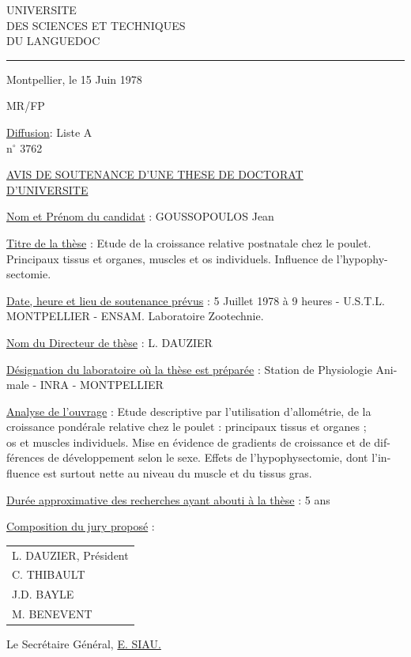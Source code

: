 UNIVERSITE\\
DES SCIENCES ET TECHNIQUES\\
DU LANGUEDOC\\
\rule{2cm}{0.4pt}

Montpellier, le 15 Juin 1978

MR/FP

\uline{Diffusion}: Liste A\\
n$^{\circ}$ 3762

\uline{AVIS DE SOUTENANCE D'UNE THESE DE DOCTORAT}\\
\uline{D'UNIVERSITE}

\uline{Nom et Prénom du candidat} : GOUSSOPOULOS Jean

\uline{Titre de la thèse} : Etude de la croissance relative postnatale chez le poulet.\\
Principaux tissus et organes, muscles et os individuels. Influence de l'hypophy-\\
sectomie.

\uline{Date, heure et lieu de soutenance prévus} : 5 Juillet 1978 à 9 heures - U.S.T.L.\\
MONTPELLIER - ENSAM. Laboratoire Zootechnie.

\uline{Nom du Directeur de thèse} : L. DAUZIER

\uline{Désignation du laboratoire où la thèse est préparée} : Station de Physiologie Ani-\\
male - INRA - MONTPELLIER

\uline{Analyse de l'ouvrage} : Etude descriptive par l'utilisation d'allométrie, de la\\
croissance pondérale relative chez le poulet : principaux tissus et organes ;\\
os et muscles individuels. Mise en évidence de gradients de croissance et de dif-\\
férences de développement selon le sexe. Effets de l'hypophysectomie, dont l'in-\\
fluence est surtout nette au niveau du muscle et du tissus gras.

\uline{Durée approximative des recherches ayant abouti à la thèse} : 5 ans

\uline{Composition du jury proposé} :
\begin{tabular}[t]{l}
L. DAUZIER, Président\\
C. THIBAULT\\
J.D. BAYLE\\
M. BENEVENT
\end{tabular}

Le Secrétaire Général,
\uline{E. SIAU.}
